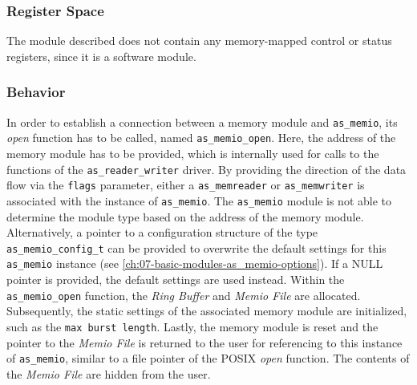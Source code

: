 \subsubsection{Register Space}

The module described does not contain any memory-mapped control or status registers, since it is a software module.

\subsubsection{Behavior}\label{ch:07-basic-modules-as_memio-behavior}

In order to establish a connection between a memory module and \texttt{as\_memio}, its \textit{open} function has to be called, named \texttt{as\_memio\_open}.
Here, the address of the memory module has to be provided, which is internally used for calls to the functions of the \texttt{as\_reader\_writer} driver.
By providing the direction of the data flow via the \texttt{flags} parameter, either a \texttt{as\_memreader} or \texttt{as\_memwriter} is associated with the instance of \texttt{as\_memio}.
The \texttt{as\_memio} module is not able to determine the module type based on the address of the memory module.
Alternatively, a pointer to a configuration structure of the type \texttt{as\_memio\_config\_t} can be provided to overwrite the default settings for this \texttt{as\_memio} instance (see \ref{ch:07-basic-modules-as_memio-options}).
If a NULL pointer is provided, the default settings are used instead.
Within the \texttt{as\_memio\_open} function, the \textit{Ring Buffer} and \textit{Memio File} are allocated.
Subsequently, the static settings of the associated memory module are initialized, such as the \texttt{max burst length}.
Lastly, the memory module is reset and the pointer to the \textit{Memio File} is returned to the user for referencing to this instance of \texttt{as\_memio}, similar to a file pointer of the POSIX \textit{open} function.
The contents of the \textit{Memio File} are hidden from the user.


